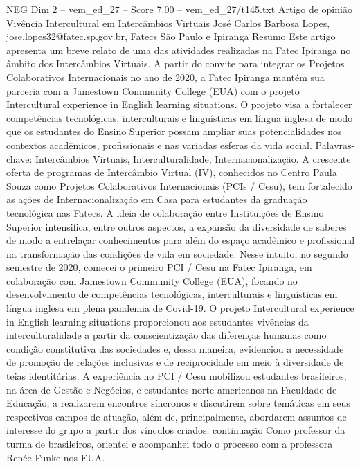 \begin{textsample}{NEG Dim 2 – vem\_ed\_27 – Score 7.00 – vem\_ed\_27/t145.txt}  \label{ex:f2_neg_171}
Artigo de opinião Vivência Intercultural em Intercâmbios Virtuais José Carlos Barbosa Lopes, jose.lopes32@fatec.sp.gov.br, Fatecs São Paulo e Ipiranga Resumo Este artigo apresenta um breve relato de uma das atividades realizadas na Fatec Ipiranga no âmbito dos Intercâmbios Virtuais.
A partir do convite para integrar os Projetos Colaborativos Internacionais no ano de 2020, a Fatec Ipiranga mantém sua parceria com a Jamestown Community College (EUA) com o projeto Intercultural experience in English learning situations.
O projeto visa a fortalecer competências tecnológicas, interculturais e linguísticas em língua inglesa de modo que os estudantes do Ensino Superior possam ampliar suas potencialidades nos contextos acadêmicos, profissionais e nas variadas esferas da vida social.
Palavras-chave: Intercâmbios Virtuais, Interculturalidade, Internacionalização.
A crescente oferta de programas de Intercâmbio Virtual (IV), conhecidos no Centro Paula Souza como Projetos Colaborativos Internacionais (PCIs / Cesu), tem fortalecido as ações de Internacionalização em Casa para estudantes da graduação tecnológica nas Fatecs.
A ideia de colaboração entre Instituições de Ensino Superior intensifica, entre outros aspectos, a expansão da diversidade de saberes de modo a entrelaçar conhecimentos para além do espaço acadêmico e profissional na transformação das condições de vida em sociedade.
Nesse intuito, no segundo semestre de 2020, comecei o primeiro PCI / Cesu na Fatec Ipiranga, em colaboração com Jamestown Community College (EUA), focando no desenvolvimento de competências tecnológicas, interculturais e linguísticas em língua inglesa em plena pandemia de Covid-19.
O projeto Intercultural experience in English learning situations proporcionou aos estudantes vivências da interculturalidade a partir da conscientização das diferenças humanas como condição constitutiva das sociedades e, dessa maneira, evidenciou a necessidade de promoção de relações inclusivas e de reciprocidade em meio à diversidade de teias identitárias.
A experiência no PCI / Cesu mobilizou estudantes brasileiros, na área de Gestão e Negócios, e estudantes norte-americanos na Faculdade de Educação, a realizarem encontros síncronos e discutirem sobre temáticas em seus respectivos campos de atuação, além de, principalmente, abordarem assuntos de interesse do grupo a partir dos vínculos criados. continuação Como professor da turma de brasileiros, orientei e acompanhei todo o processo com a professora Renée Funke nos EUA.

\end{textsample}
